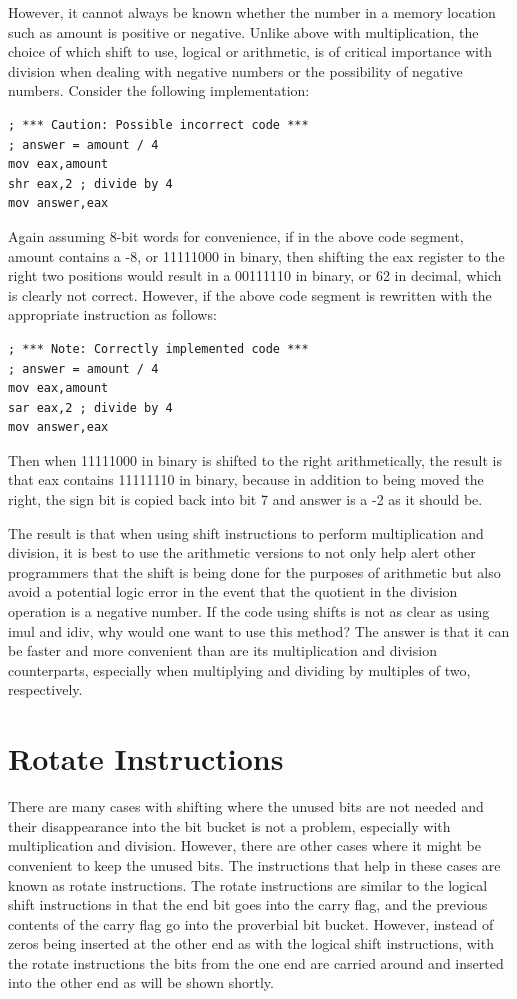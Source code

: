 \documentclass[10pt]{book}
\begin{document}
However, it cannot always be known whether the number in a memory location such as amount is positive or negative. Unlike above with multiplication, the choice of which shift to use, logical or arithmetic, is of critical importance with division when dealing with negative numbers or the possibility of negative numbers. Consider the following implementation:

\begin{verbatim}
; *** Caution: Possible incorrect code ***
; answer = amount / 4
mov eax,amount
shr eax,2 ; divide by 4
mov answer,eax
\end{verbatim}

Again assuming 8-bit words for convenience, if in the above code segment, amount contains a -8, or 11111000 in binary, then shifting the eax register to the right two positions would result in a 00111110 in binary, or 62 in decimal, which is clearly not correct. However, if the above code segment is rewritten with the appropriate instruction as follows:
\begin{verbatim}
; *** Note: Correctly implemented code ***
; answer = amount / 4
mov eax,amount
sar eax,2 ; divide by 4
mov answer,eax
\end{verbatim}

Then when 11111000 in binary is shifted to the right arithmetically, the result is that eax contains 11111110 in binary, because in addition to being moved the right, the sign bit is copied back into bit 7 and answer is a -2 as it should be.

The result is that when using shift instructions to perform multiplication and division, it is best to use the arithmetic versions to not only help alert other programmers that the shift is being done for the purposes of arithmetic but also avoid a potential logic error in the event that the quotient in the division operation is a negative number. If the code using shifts is not as clear as using imul and idiv, why would one want to use this method? The answer is that it can be faster and more convenient than are its multiplication and division counterparts, especially when multiplying and dividing by multiples of two, respectively.

\section{Rotate Instructions}
There are many cases with shifting where the unused bits are not needed and their disappearance into the bit bucket is not a problem, especially with multiplication and division. However, there are other cases where it might be convenient to keep the unused bits. The instructions that help in these cases are known as rotate instructions. The rotate instructions are similar to the logical shift instructions in that the end bit goes into the carry flag, and the previous contents of the carry flag go into the proverbial bit bucket. However, instead of zeros being inserted at the other end as with the logical shift instructions, with the rotate instructions the bits from the one end are carried around and inserted into the other end as will be shown shortly.
\end{document}
